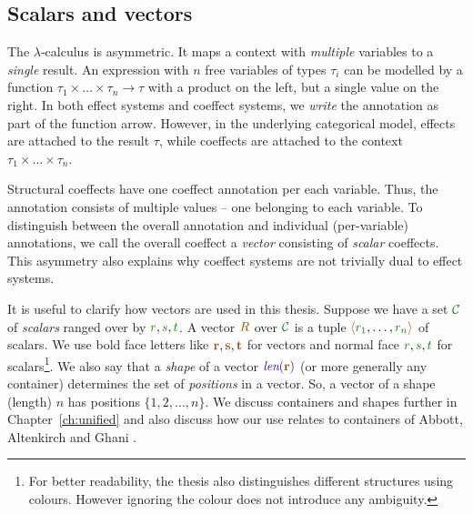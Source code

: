 
\subsection{Scalars and vectors}
\label{sec:applications-strucutre-vec}

The $\lambda$-calculus is asymmetric. It maps a context with \emph{multiple} variables to a 
\emph{single} result. An expression with $n$ free variables of types $\tau_i$ can be modelled by a function 
$\tau_1 \times \ldots \times \tau_n \rightarrow \tau$ with a product on the left, but a single value
on the right. In both effect systems and coeffect systems, we \emph{write} the annotation as part of
the function arrow. However, in the underlying categorical model, effects are attached to the result
$\tau$, while coeffects are attached to the context $\tau_1 \times \ldots \times \tau_n$.

Structural coeffects have one coeffect annotation per each variable. Thus, the annotation consists
of multiple values -- one belonging to each variable. To distinguish between the overall annotation
and individual (per-variable) annotations, we call the overall coeffect a \emph{vector} consisting of 
\emph{scalar} coeffects. This asymmetry also explains why coeffect systems are not trivially dual to 
effect systems.

It is useful to clarify how vectors are used in this thesis. Suppose we have a set $\C$ of
\emph{scalars} ranged over by $\cclrd{r},\cclrd{s},\cclrd{t}$. A vector $\aclrd{R}$ 
over $\C$ is a tuple $\alift{ \cclrd{r_1}, \ldots, \cclrd{r_n} }$ of scalars. 
We use bold face letters like $\aclrd{\textbf{r}}, \aclrd{\textbf{s}}, \aclrd{\textbf{t}}$ for vectors and 
normal face $\cclrd{r},\cclrd{s},\cclrd{t}$ for scalars\footnote{For better readability, the thesis
also distinguishes different structures using colours. However ignoring the colour does not introduce 
any ambiguity.}. We also say that a \emph{shape} of a vector $\slen{\aclrd{\textbf{r}}}$ (or more generally any container) 
determines the set of \emph{positions} in a vector. So, a vector of a shape (length) $n$ has positions 
$\{ 1, 2, \ldots, n \}$. We discuss containers and shapes further in Chapter~\ref{ch:unified} and also 
discuss how our use relates to containers of Abbott, Altenkirch and Ghani \cite{types-containers}.

